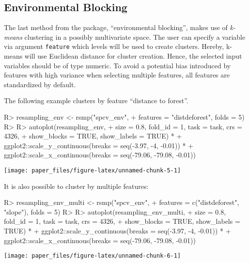 \documentclass[
]{jss}
\begin{document}
\hypertarget{environmental-blocking}{%
\subsection{Environmental Blocking}\label{environmental-blocking}}

The last method from the  package, ``environmental
blocking'', makes use of \emph{k-means} clustering \citep{hartigan1979a}
in a possibly multivariate space. The user can specify a variable via
argument \texttt{feature} which levels will be used to create clusters.
Hereby, k-means will use Euclidean distance for cluster creation. Hence,
the selected input variables should be of type numeric. To avoid a
potential bias introduced by features with high variance when selecting
multiple features, all features are standardized by default.

The following example clusters by feature ``distance to forest''.

\begin{CodeChunk}
\begin{CodeInput}
R> resampling_env <- rsmp("spcv_env",
+   features = "distdeforest", folds = 5)
R> 
R> autoplot(resampling_env,
+   size = 0.8, fold_id = 1, task = task, crs = 4326,
+   show_blocks = TRUE, show_labels = TRUE) *
+   ggplot2::scale_y_continuous(breaks = seq(-3.97, -4, -0.01)) *
+   ggplot2::scale_x_continuous(breaks = seq(-79.06, -79.08, -0.01))
\end{CodeInput}


\begin{center}\texttt{[image: paper\_files/figure-latex/unnamed-chunk-5-1]} \end{center}

\end{CodeChunk}

It is also possible to cluster by multiple features:

\begin{CodeChunk}
\begin{CodeInput}
R> resampling_env_multi <- rsmp("spcv_env",
+   features = c("distdeforest", "slope"), folds = 5)
R> 
R> autoplot(resampling_env_multi,
+   size = 0.8, fold_id = 1, task = task, crs = 4326,
+   show_blocks = TRUE, show_labels = TRUE) *
+   ggplot2::scale_y_continuous(breaks = seq(-3.97, -4, -0.01)) *
+   ggplot2::scale_x_continuous(breaks = seq(-79.06, -79.08, -0.01))
\end{CodeInput}


\begin{center}\texttt{[image: paper\_files/figure-latex/unnamed-chunk-6-1]} \end{center}

\end{CodeChunk}
\end{document}
